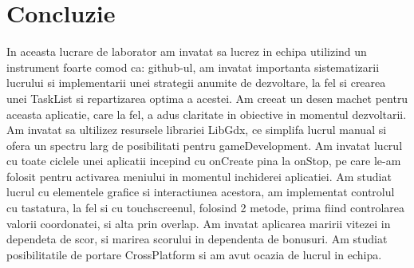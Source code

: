 \section*{Concluzie}


In aceasta lucrare de laborator am invatat sa lucrez in echipa utilizind un instrument foarte comod ca: github-ul, am invatat importanta sistematizarii lucrului si implementarii unei strategii anumite de dezvoltare, la fel si crearea unei TaskList si repartizarea optima a acestei. Am creeat un desen machet pentru aceasta aplicatie, care la fel, a adus claritate in obiective in momentul dezvoltarii. Am invatat sa ultilizez resursele librariei LibGdx, ce simplifa lucrul manual si ofera un spectru larg de posibilitati pentru gameDevelopment. Am invatat lucrul cu toate ciclele unei aplicatii incepind cu onCreate pina la onStop, pe care le-am folosit pentru activarea meniului in momentul inchiderei aplicatiei. Am studiat lucrul cu elementele grafice si interactiunea acestora, am implementat controlul cu tastatura, la fel si cu touchscreenul, folosind 2 metode, prima fiind controlarea valorii coordonatei, si alta prin overlap. Am invatat aplicarea maririi vitezei in dependeta de scor, si marirea scorului in dependenta de bonusuri. Am studiat posibilitatile de portare CrossPlatform si am avut ocazia de lucrul in echipa.
\clearpage